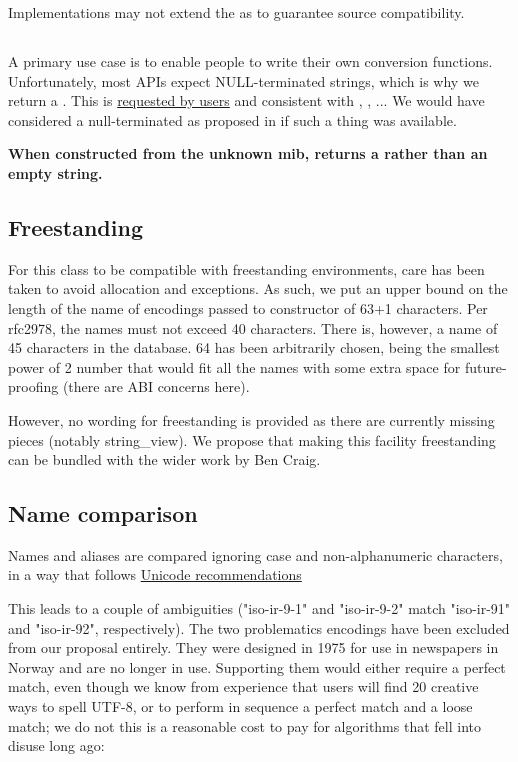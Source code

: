 \documentclass{wg21}
\begin{document}
Implementations may not extend the  as to guarantee source compatibility.

\subsection{}

A primary use case is to enable people to write their own conversion functions.
Unfortunately, most APIs expect NULL-terminated strings, which is why we return a .
This is \href{https://gcc.gnu.org/bugzilla/show_bug.cgi?id=98576#c2}{requested by users} and consistent with ,
, ...
We would have considered a null-terminated  as proposed in  if such a thing was available.

\textbf{When constructed from the unknown mib,  returns a  rather than an empty string.}

\subsection{Freestanding}

For this class to be compatible with freestanding environments, care has been taken to avoid
allocation and exceptions.
As such, we put an upper bound on the length of the name of encodings passed to  constructor of 63+1 characters.
Per rfc2978, the names must not exceed 40 characters.
There is, however, a name of 45 characters in the database.
64 has been arbitrarily chosen, being the smallest power of 2 number that would fit all the names with some extra space for future-proofing (there are ABI concerns here).

However, no wording for freestanding is provided as there are currently missing pieces (notably string_view).
We propose that making this facility freestanding can be bundled with the wider work by Ben Craig.

\subsection{Name comparison}

Names and aliases are compared ignoring case and non-alphanumeric characters, in a way that follows
\href{https://www.unicode.org/reports/tr22/tr22-8.html#Charset_Alias_Matching}{Unicode recommendations}

This leads to a couple of ambiguities ("iso-ir-9-1" and "iso-ir-9-2" match "iso-ir-91" and "iso-ir-92", respectively).
The two problematics encodings have been excluded from our proposal entirely.
They were designed in 1975 for use in newspapers in Norway and are no longer in use. Supporting them would either require a perfect match, even though we know from experience that users will find 20 creative ways to spell UTF-8, or to perform in sequence a perfect match and a loose match; we do not this is a reasonable cost to pay for algorithms that fell into disuse long ago:
\end{document}

